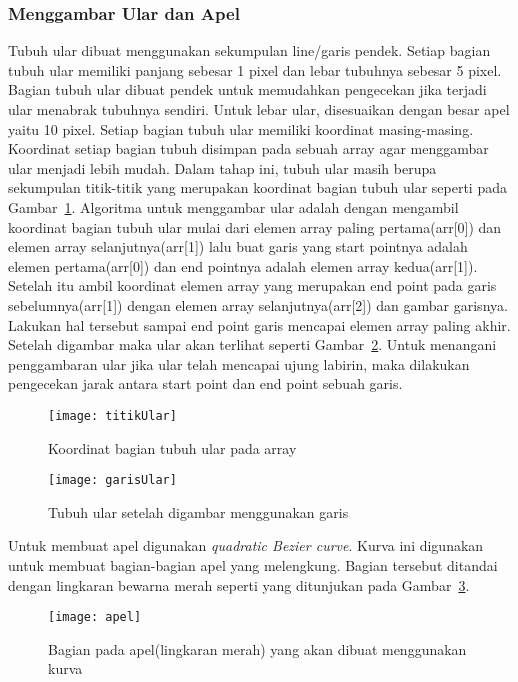 \subsubsection{Menggambar Ular dan Apel}
Tubuh ular dibuat menggunakan sekumpulan line/garis pendek. Setiap bagian tubuh ular memiliki panjang sebesar 1 pixel dan lebar tubuhnya sebesar 5 pixel. Bagian tubuh ular dibuat pendek untuk memudahkan pengecekan jika terjadi ular menabrak tubuhnya sendiri. Untuk lebar ular, disesuaikan dengan besar apel yaitu 10 pixel. Setiap bagian tubuh ular memiliki koordinat masing-masing. Koordinat setiap bagian tubuh disimpan pada sebuah array agar menggambar ular menjadi lebih mudah. Dalam tahap ini, tubuh ular masih berupa sekumpulan titik-titik yang merupakan koordinat bagian tubuh ular seperti pada Gambar~\ref{fig:titikUlar}. Algoritma untuk menggambar ular adalah dengan mengambil koordinat bagian tubuh ular mulai dari elemen array paling pertama(arr[0]) dan elemen array selanjutnya(arr[1]) lalu buat garis yang start pointnya adalah elemen pertama(arr[0]) dan end pointnya adalah elemen array kedua(arr[1]). Setelah itu ambil koordinat elemen array yang merupakan end point pada garis sebelumnya(arr[1]) dengan elemen array selanjutnya(arr[2]) dan gambar garisnya. Lakukan hal tersebut sampai end point garis mencapai elemen array paling akhir. Setelah digambar maka ular akan terlihat seperti Gambar~\ref{fig:garisUlar}. Untuk menangani penggambaran ular jika ular telah mencapai ujung labirin, maka dilakukan pengecekan jarak antara start point dan end point sebuah garis. 

\begin{figure}[H]
	\centering  
	\texttt{[image: titikUlar]}  
	\caption[Koordinat bagian tubuh ular pada array]{Koordinat bagian tubuh ular pada array}
	\label{fig:titikUlar} 
\end{figure}

\begin{figure}[H]
	\centering  
	\texttt{[image: garisUlar]}  
	\caption[Tubuh ular setelah digambar menggunakan garis]{Tubuh ular setelah digambar menggunakan garis}
	\label{fig:garisUlar} 
\end{figure}

Untuk membuat apel digunakan \textit{quadratic Bezier curve}. Kurva ini digunakan untuk membuat bagian-bagian apel yang melengkung. Bagian tersebut ditandai dengan lingkaran bewarna merah seperti yang ditunjukan pada Gambar~\ref{fig:apel}.

\begin{figure}[H]
	\centering  
	\texttt{[image: apel]}  
	\caption[Bagian pada apel(lingkaran merah) yang akan dibuat menggunakan kurva]{Bagian pada apel(lingkaran merah) yang akan dibuat menggunakan kurva}
	\label{fig:apel} 
\end{figure}

